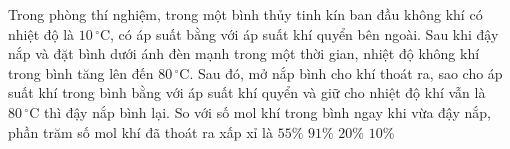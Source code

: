 	\begin{ex}%
		Trong phòng thí nghiệm, trong một bình thủy tinh kín ban đầu không khí có nhiệt độ là $10\,^\circ\text{C}$, có áp suất bằng với áp suất khí quyển bên ngoài. Sau khi đậy nắp và đặt bình dưới ánh đèn mạnh trong một thời gian, nhiệt độ không khí trong bình tăng lên đến $80\,^\circ\text{C}$. Sau đó, mở nắp bình cho khí thoát ra, sao cho áp suất khí trong bình bằng với áp suất khí quyển và giữ cho nhiệt độ khí vẫn là $80\,^\circ\text{C}$ thì đậy nắp bình lại. So với số mol khí trong bình ngay khi vừa đậy nắp, phần trăm số mol khí đã thoát ra xấp xỉ là
		\choice
		{$55\%$}
		{$91\%$}
		{\True $20\%$}
		{$10\%$}
	\end{ex}

